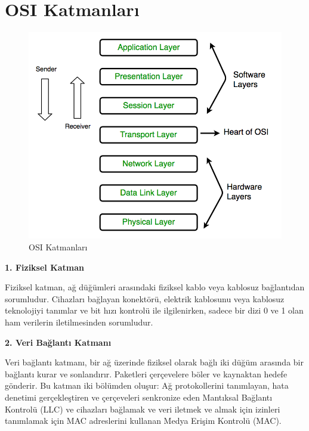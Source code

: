 \section{OSI Katmanları}
\begin{figure}[!htb]
    \centering
    \includegraphics[width=1\linewidth]{00-images/08-osi_layers.png}
    \caption{OSI Katmanları}
    \label{fig:my_label}
\end{figure}


\vspace{10mm}
\textbf{1. Fiziksel Katman}
\vspace{5mm}

Fiziksel katman, ağ düğümleri arasındaki fiziksel kablo veya kablosuz bağlantıdan sorumludur. Cihazları bağlayan konektörü, elektrik kablosunu veya kablosuz teknolojiyi tanımlar ve bit hızı kontrolü ile ilgilenirken, sadece bir dizi 0 ve 1 olan ham verilerin iletilmesinden sorumludur.

\vspace{10mm}
\textbf{2. Veri Bağlantı Katmanı}
\vspace{5mm}

Veri bağlantı katmanı, bir ağ üzerinde fiziksel olarak bağlı iki düğüm arasında bir bağlantı kurar ve sonlandırır. Paketleri çerçevelere böler ve kaynaktan hedefe gönderir. Bu katman iki bölümden oluşur: Ağ protokollerini tanımlayan, hata denetimi gerçekleştiren ve çerçeveleri senkronize eden Mantıksal Bağlantı Kontrolü (LLC) ve cihazları bağlamak ve veri iletmek ve almak için izinleri tanımlamak için MAC adreslerini kullanan Medya Erişim Kontrolü (MAC).

